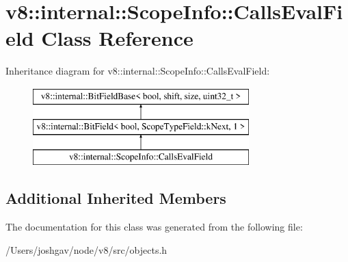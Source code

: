 \hypertarget{classv8_1_1internal_1_1_scope_info_1_1_calls_eval_field}{}\section{v8\+:\+:internal\+:\+:Scope\+Info\+:\+:Calls\+Eval\+Field Class Reference}
\label{classv8_1_1internal_1_1_scope_info_1_1_calls_eval_field}
Inheritance diagram for v8\+:\+:internal\+:\+:Scope\+Info\+:\+:Calls\+Eval\+Field\+:\begin{figure}[H]
\begin{center}
\leavevmode
\includegraphics[height=3.000000cm]{classv8_1_1internal_1_1_scope_info_1_1_calls_eval_field}
\end{center}
\end{figure}
\subsection*{Additional Inherited Members}


The documentation for this class was generated from the following file\+:\begin{DoxyCompactItemize}
\item 
/\+Users/joshgav/node/v8/src/objects.\+h\end{DoxyCompactItemize}
